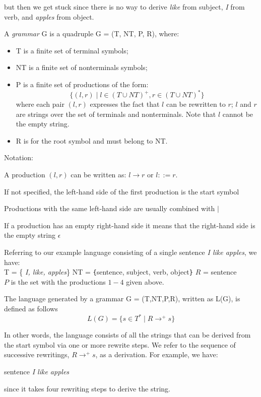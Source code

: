 \documentclass{article}
\begin{document}
 \noindent
 but  then we get stuck since there is no way to derive \emph{like} from subject,  \emph{I} from verb, and
 \emph{apples} from object. 


\begin{definition}
A {\emph{grammar}} G is a quadruple G = (T, NT, P, R), where:
\begin{itemize}
\item
T is a finite  set of terminal symbols;
\item
NT is a finite set  of nonterminals symbols;
\item
P is a finite  set of productions of the form:
$$\{ (l, r) \mid l  \in (T \cup NT)^+, r \in (T \cup NT)^* \}$$
where each pair $(l,r)$ expresses the fact that $l$ can be rewritten to $r$;
$l$ and $r$ are
strings over the set of terminals and nonterminals. Note that $l$ cannot be the empty string.
\item
R  is for the root symbol and must belong to NT.
\end{itemize}
\end{definition}

Notation: 
\begin{tightlist}
\item
A production $(l,r)$ can be written as: 
$l \rightarrow r$ or $l ::= r$.
\item
If not specified, the left-hand side of the first production is the start symbol
\item
Productions with the same left-hand side are usually combined with $\mid$
\item
If a production has an empty right-hand side it means that the right-hand side
is the empty string $\epsilon$
\end{tightlist}

\begin{example}
Referring to our example language consisting of a single sentence \emph{I like apples}, we have: \\
T = \{ {\emph{I, like, apples}}\}
\newline
NT = \verb|{|sentence, subject, verb, object\verb|}|
\newline
$R$ = sentence \\
$P$  is the set with the productions $1-4$ given above.
\end{example}

\begin{definition}
The language generated by a grammar G = (T,NT,P,R), written as L(G), is defined as follows
$$L(G) = \{ s \in T^* \mid R \to^+ s \}$$
\end{definition}
In other words, the language consists of all the strings that can be derived from
the start symbol via one or more rewrite steps.
We refer to the sequence of successive rewritings, $R \to^+ s$,  as a
 {\color{red} derivation}. For example, we have: 
\begin{center}
sentence  \emph{I like apples}
\end{center}
since it takes four rewriting steps to derive the string. 
\end{document}

